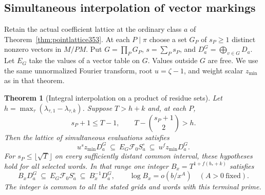 \documentclass[a4paper,11pt]{article}
\newtheorem{theorem}[proposition]{Theorem}
\theoremstyle{definition}
\theoremstyle{remark}
\numberwithin{equation}{section}
\begin{document}
\subsection{Simultaneous interpolation of vector markings}\label{sec:grid354}

Retain the actual coefficient lattice at the ordinary class \(a\)
of Theorem~\ref{thm:pointlattice353}. At each \(P\mid\pi\) choose
a set \(G_P\) of \(s_P\ge1\) distinct nonzero vectors in \(M/PM\).
Put \(G=\prod_P G_P\), \(s=\sum_P s_P\), and
\(D_a^G=\bigoplus_{v\in G}D_a\). Let \(E_G\) take the values of
a vector table on \(G\). Values outside \(G\) are free. We use
the same unnormalized Fourier transform, root \(u=\zeta-1\), and
weight scalar \(z_{\min}\) as in that theorem.

\begin{theorem}[Integral interpolation on a product of residue sets]\leavevmode
\label{thm:grid354}
Let \(h=\max_\tau(\lambda_{\tau,1}-\lambda_{\tau,k})\).
Suppose \(T>h+k\) and, at each \(P\),
\[
       s_P+1\le T-1,\qquad T-\binom{s_P+1}{2}>h .
\]
Then the lattice of simultaneous evaluations satisfies
\[
     u^s z_{\min} D_a^G
       \ \subseteq\ E_G\mathcal F_0 S_a^\circ
       \ \subseteq\ u^f z_{\min}D_a^G .
\]
For \(s_P\le\lfloor\sqrt T\rfloor\) on every sufficiently distant
common interval, these hypotheses hold for all selected words.
In that range one integer \(B_x=T^{1+f(b_*+k)}\) satisfies
\[
        B_xD_a^G\ \subseteq\ E_G\mathcal F_0 S_a^\circ
                     \ \subseteq\ B_x^{-1}D_a^G ,
       \qquad \log B_x=o(b/x^A)\quad(A>0\ \text{fixed}).
\]
The integer is common to all the stated grids and words with
this terminal prime.
\end{theorem}
\end{document}
